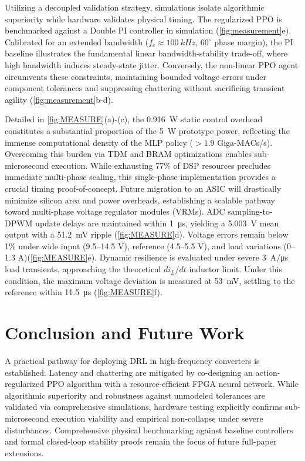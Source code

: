 \documentclass[conference,onecolumn,letterpaper,romanappendices,12pt,english,nofonttune]{IEEEtran}
\begin{document}
Utilizing a decoupled validation strategy, simulations isolate algorithmic superiority while hardware validates physical timing. The regularized PPO is benchmarked against a Double PI controller in simulation (\cref{fig:measurement}e). Calibrated for an extended bandwidth ($f_c \approx \SI{100}{kHz}$, $60^\circ$ phase margin), the PI baseline illustrates the fundamental linear bandwidth-stability trade-off, where high bandwidth induces steady-state jitter. Conversely, the non-linear PPO agent circumvents these constraints, maintaining bounded voltage errors under component tolerances and suppressing chattering without sacrificing transient agility (\cref{fig:measurement}b-d).

Detailed in \cref{fig:MEASURE}(a)-(c), the \SI{0.916}{W} static control overhead constitutes a substantial proportion of the \SI{5}{W} prototype power, reflecting the immense computational density of the MLP policy ($>1.9$ Giga-MACs/s). Overcoming this burden via TDM and BRAM optimizations enables sub-microsecond execution. While exhausting 77\% of DSP resources precludes immediate multi-phase scaling, this single-phase implementation provides a crucial timing proof-of-concept. Future migration to an ASIC will drastically minimize silicon area and power overheads, establishing a scalable pathway toward multi-phase voltage regulator modules (VRMs). ADC sampling-to-DPWM update delays are maintained within \SI{1}{\micro s}, yielding a \SI{5.003}{V} mean output with a \SI{51.2}{mV} ripple (\cref{fig:MEASURE}d). Voltage errors remain below 1\% under wide input (9.5–14.5 V), reference (4.5–5.5 V), and load variations (0–1.3 A)(\cref{fig:MEASURE}e). Dynamic resilience is evaluated under severe \SI{3}{A/\micro\second} load transients, approaching the theoretical $di_L/dt$ inductor limit. Under this condition, the maximum voltage deviation is measured at \SI{53}{mV}, settling to the reference within \SI{11.5}{\micro s} (\cref{fig:MEASURE}f).

\section{Conclusion and Future Work}
A practical pathway for deploying DRL in high-frequency converters is established. Latency and chattering are mitigated by co-designing an action-regularized PPO algorithm with a resource-efficient FPGA neural network. While algorithmic superiority and robustness against unmodeled tolerances are validated via comprehensive simulations, hardware testing explicitly confirms sub-microsecond execution viability and empirical non-collapse under severe disturbances. Comprehensive physical benchmarking against baseline controllers and formal closed-loop stability proofs remain the focus of future full-paper extensions.



\end{document}
